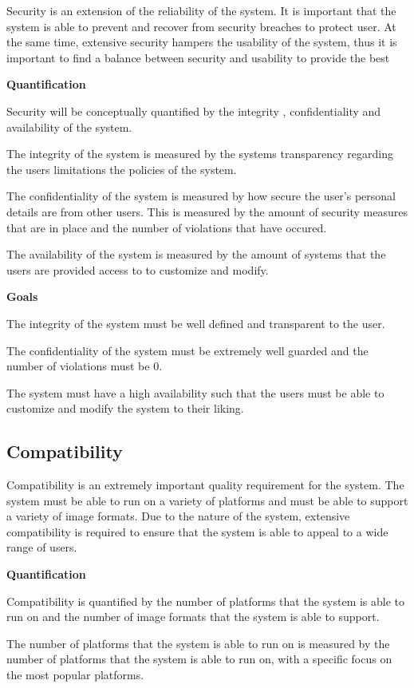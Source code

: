 \documentclass[11pt,a4paper]{article}
\begin{document}
Security is an extension of the reliability of the system. It is important that the system is able to prevent and recover from security breaches to protect user.
At the same time, extensive security hampers the usability of the system, thus it is important to find a balance between security and usability to provide the best 

{\bf Quantification} 

Security will be conceptually quantified by the integrity , confidentiality and availability of the system.

The integrity of the system is measured by the systems transparency regarding the users limitations the policies of the system.

The confidentiality of the system is measured by how secure the user's personal details are from other users. This is measured by the amount of security measures that are in place and the number of violations that have occured.

The availability of the system is measured by the amount of systems that the users are provided access to to customize and modify.

{\bf Goals}

The integrity of the system must be well defined and transparent to the user.

The confidentiality of the system must be extremely well guarded and the number of violations must be 0.

The system must have a high availability such that the users must be able to customize and modify the system to their liking.

\subsection*{Compatibility} 

Compatibility is an extremely important quality requirement for the system. The
system must be able to run on a variety of platforms and must be able to support
a variety of image formats. Due to the nature of the system, extensive
compatibility is required to ensure that the system is able to appeal to a wide
range of users.

{\bf Quantification}

Compatibility is quantified by the number of platforms that the system is able
to run on and the number of image formats that the system is able to support.

The number of platforms that the system is able to run on is measured by the
number of platforms that the system is able to run on, with a specific focus on
the most popular platforms.
\end{document}
